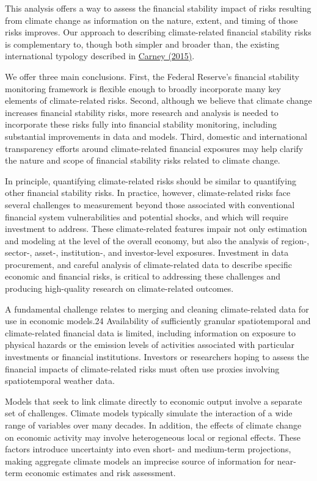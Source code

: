 \documentclass[
]{book}
\begin{document}
This analysis offers a way to assess the financial stability impact of risks resulting from climate change as information on the nature, extent, and timing of those risks improves. Our approach to describing climate-related financial stability risks is complementary to, though both simpler and broader than, the existing international typology described in \href{https://www.bis.org/review/r151009a.pdf}{Carney (2015)}.

We offer three main conclusions. First, the Federal Reserve's financial stability monitoring framework is flexible enough to broadly incorporate many key elements of climate-related risks. Second, although we believe that climate change increases financial stability risks, more research and analysis is needed to incorporate these risks fully into financial stability monitoring, including substantial improvements in data and models. Third, domestic and international transparency efforts around climate-related financial exposures may help clarify the nature and scope of financial stability risks related to climate change.

In principle, quantifying climate-related risks should be similar to quantifying other financial stability risks. In practice, however, climate-related risks face several challenges to measurement beyond those associated with conventional financial system vulnerabilities and potential shocks, and which will require investment to address. These climate-related features impair not only estimation and modeling at the level of the overall economy, but also the analysis of region-, sector-, asset-, institution-, and investor-level exposures. Investment in data procurement, and careful analysis of climate-related data to describe specific economic and financial risks, is critical to addressing these challenges and producing high-quality research on climate-related outcomes.

A fundamental challenge relates to merging and cleaning climate-related data for use in economic models.24 Availability of sufficiently granular spatiotemporal and climate-related financial data is limited, including information on exposure to physical hazards or the emission levels of activities associated with particular investments or financial institutions. Investors or researchers hoping to assess the financial impacts of climate-related risks must often use proxies involving spatiotemporal weather data.

Models that seek to link climate directly to economic output involve a separate set of challenges. Climate models typically simulate the interaction of a wide range of variables over many decades. In addition, the effects of climate change on economic activity may involve heterogeneous local or regional effects. These factors introduce uncertainty into even short- and medium-term projections, making aggregate climate models an imprecise source of information for near-term economic estimates and risk assessment.
\end{document}
